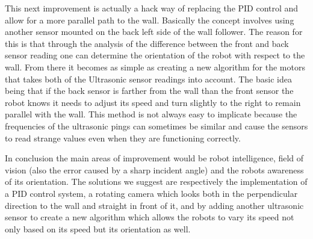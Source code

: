 \documentclass[letterpaper,12pt]{article}
\begin{document}
{This next improvement is actually a hack way of replacing the PID control and allow for a more parallel path to the wall. Basically the concept involves using another sensor mounted on the back left side of the wall follower. The reason for this is that through the analysis of the difference between the front and back sensor reading one can determine the orientation of the robot with respect to the wall. From there it becomes as simple as creating a new algorithm for the motors that takes both of the Ultrasonic sensor readings into account. The basic idea being that if the back sensor is farther from the wall than the front sensor the robot knows it needs to adjust its speed and turn slightly to the right to remain parallel with the wall. This method is not always easy to implicate because the frequencies of the ultrasonic pings can sometimes be similar and cause the sensors to read strange values even when they are functioning correctly.

In conclusion the main areas of improvement would be robot intelligence, field of vision (also the error caused by a sharp incident angle) and the robots awareness of its orientation. The solutions we suggest are respectively the implementation of a PID control system, a rotating camera which looks both in the perpendicular direction to the wall and straight in front of it, and by adding another ultrasonic sensor to create a new algorithm which allows the robots to vary its speed not only based on its speed but its orientation as well.}
\end{document}
